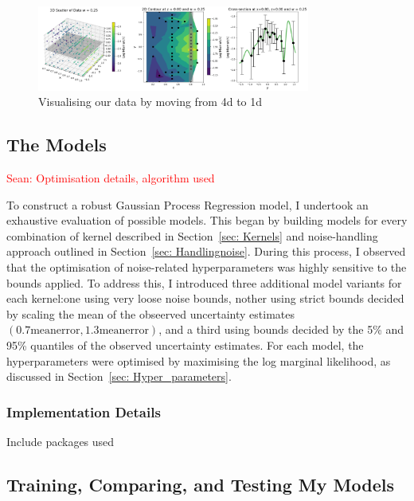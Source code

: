 \documentclass{article}
\newcommand{\Sean}[1]{{\textcolor{red}{{Sean: #1}} }}
\begin{document}
\begin{figure}[H]
    \centering
    \includegraphics[width=0.8\textwidth]{LatexPlots/final_gps_plots/data_visual.png}
    \caption{Visualising our data by moving from 4d to 1d}
    \label{fig:visualising_data}
\end{figure}


\subsection*{The Models}
\Sean{Optimisation details, algorithm used}

To construct a robust Gaussian Process Regression model, I undertook an exhaustive evaluation of possible models.
This began by building models for every combination of kernel described in Section~\ref{sec: Kernels} and noise-handling approach outlined in Section~\ref{sec: Handlingnoise}.
During this process, I observed that the optimisation of noise-related hyperparameters was highly sensitive to the bounds applied. To address this, I introduced three additional model variants for each kernel:one using very loose noise bounds,
 nother using strict bounds decided by scaling the mean of the obseerved uncertainty estimates $(0.7\text{meanerror},1.3\text{meanerror})$, and a third using bounds decided by the 5\% and 95\% quantiles of the observed uncertainty estimates.
For each model, the hyperparameters were optimised by maximising the log marginal likelihood, as discussed in Section~\ref{sec: Hyper_parameters}.


\subsubsection*{Implementation Details}
Include packages used 

\subsection{Training, Comparing, and Testing My Models}
\end{document}
